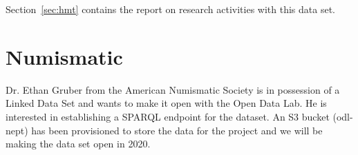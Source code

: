 Section~\ref{sec:hmt} contains the report on research activities with this data set.

\section{Numismatic}
Dr. Ethan Gruber from the American Numismatic Society is in possession of a Linked Data Set  and wants to make it open with the Open Data Lab. He is interested in establishing a SPARQL endpoint for the  dataset. An S3 bucket (odl-nept) has been provisioned to store the data for the project and we will be making the data set open in 2020.